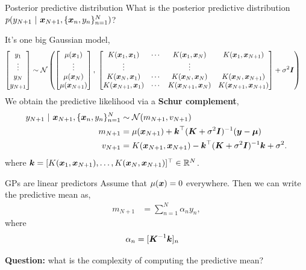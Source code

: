 \documentclass[aspectratio=169]{beamer}
\begin{document}
\begin{frame}{Posterior predictive distribution}
What is the posterior predictive distribution $p(y_{N+1} ~\vert~ \boldsymbol{x}_{N+1}, \{\boldsymbol{x}_n, y_n\}_{n=1}^N)$?

It's one big Gaussian model,
\begin{align}
    \begin{bmatrix}
    y_1 \\ \vdots \\ y_N \\ y_{N+1} 
    \end{bmatrix} 
    &\sim 
    \mathcal{N} \left(
    \begin{bmatrix}
    \mu(\boldsymbol{x}_1) \\ \vdots \\ \mu(\boldsymbol{x}_N) \\ \mu(\boldsymbol{x}_{N+1})
    \end{bmatrix}, \;
    \begin{bmatrix}
    K(\boldsymbol{x}_1, \boldsymbol{x}_1) & \cdots & K(\boldsymbol{x}_1, \boldsymbol{x}_N) & K(\boldsymbol{x}_1, \boldsymbol{x}_{N+1}) \\ 
    \vdots & & \vdots \\ 
    K(\boldsymbol{x}_N, \boldsymbol{x}_1) & \cdots & K(\boldsymbol{x}_N, \boldsymbol{x}_N) & K(\boldsymbol{x}_N, \boldsymbol{x}_{N+1}) \\
    K(\boldsymbol{x}_{N+1}, \boldsymbol{x}_1) & \cdots & K(\boldsymbol{x}_{N+1}, \boldsymbol{x}_N) & K(\boldsymbol{x}_{N+1}, \boldsymbol{x}_{N+1}) \\
    \end{bmatrix}
    + \sigma^2 \boldsymbol{I}
    \right)
\end{align}
We obtain the predictive likelihood via a \textbf{Schur complement},
\begin{align}
    y_{N+1} ~\vert~ \boldsymbol{x}_{N+1}, \{\boldsymbol{x}_n, y_n\}_{n=1}^N 
    &\sim
    \mathcal{N}(m_{N+1}, v_{N+1}) \\
    m_{N+1} &= \mu(\boldsymbol{x}_{N+1}) + \boldsymbol{k}^\top (\boldsymbol{K} + \sigma^2 \boldsymbol{I})^{-1} (\boldsymbol{y} - \boldsymbol{\mu}) \\
    v_{N+1} &= K(\boldsymbol{x}_{N+1}, \boldsymbol{x}_{N+1}) - \boldsymbol{k}^\top (\boldsymbol{K} + \sigma^2 \boldsymbol{I})^{-1} \boldsymbol{k} + \sigma^2.
\end{align}
where $\boldsymbol{k} = [K(\boldsymbol{x}_1, \boldsymbol{x}_{N+1}), \ldots, K(\boldsymbol{x}_N, \boldsymbol{x}_{N+1})]^\top \in \mathbb{R}^N$.
\end{frame}

\begin{frame}{GPs are linear predictors}
Assume that $\mu(\boldsymbol{x}) = 0$ everywhere.  Then we can write the predictive mean as,
\begin{align}
    m_{N+1} &= \sum_{n=1}^N \alpha_n y_n,
\end{align}
where
\begin{align}
    \alpha_n &= [\boldsymbol{K}^{-1} \boldsymbol{k}]_n
\end{align}

\textbf{Question: } what is the complexity of computing the predictive mean?
\end{frame}
\end{document}
